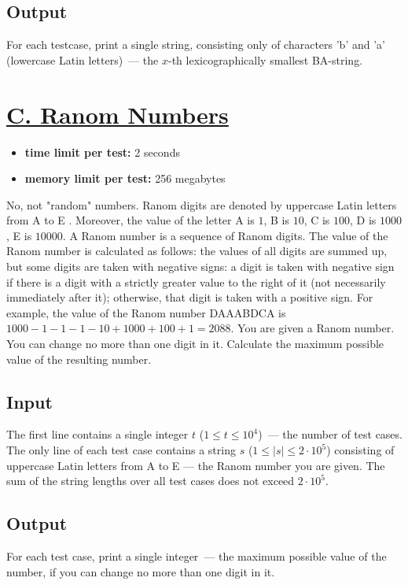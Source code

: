 \documentclass{article}
\begin{document}
\subsection*{Output}
 For each testcase, print a single string, consisting only of characters 'b' and 'a' (lowercase Latin letters) — the $x$-th lexicographically smallest BA-string.

\section{\href{https://codeforces.com/problemset/problem/1841/C}{C. Ranom Numbers}}

\begin{itemize}
\item \textbf{time limit per test:}  2 seconds
\item \textbf{memory limit per test:}  256 megabytes
\end{itemize}
No, not "random" numbers. Ranom digits are denoted by uppercase Latin letters from A to E . Moreover, the value of the letter A is $1$, B is $10$, C is $100$, D is $1000$, E is $10000$. A Ranom number is a sequence of Ranom digits. The value of the Ranom number is calculated as follows: the values of all digits are summed up, but some digits are taken with negative signs: a digit is taken with negative sign if there is a digit with a strictly greater value to the right of it (not necessarily immediately after it); otherwise, that digit is taken with a positive sign. For example, the value of the Ranom number DAAABDCA is $1000 - 1 - 1 - 1 - 10 + 1000 + 100 + 1 = 2088$. You are given a Ranom number. You can change no more than one digit in it. Calculate the maximum possible value of the resulting number.

\subsection*{Input}
 The first line contains a single integer $t$ ($1 \le t \le 10^4$) — the number of test cases. The only line of each test case contains a string $s$ ($1 \le |s| \le 2 \cdot 10^5$) consisting of uppercase Latin letters from A to E — the Ranom number you are given. The sum of the string lengths over all test cases does not exceed $2 \cdot 10^5$.

\subsection*{Output}
 For each test case, print a single integer — the maximum possible value of the number, if you can change no more than one digit in it.
\end{document}
